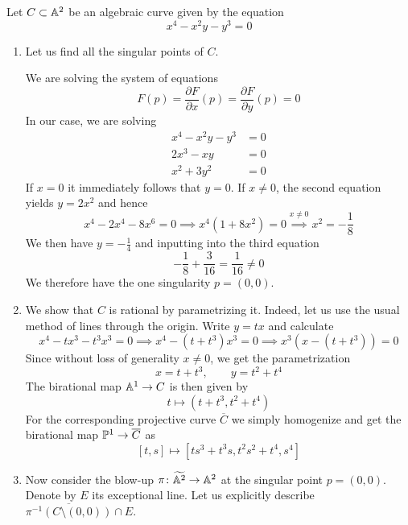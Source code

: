 \documentclass[a4paper, 12pt]{article}
\begin{document}
\begin{Exercise}
    Let $C \subset \A^2$ be an algebraic curve given by the equation
    \[
        x^4 - x^2y - y^3 = 0
    \]
    \begin{enumerate}[label=(\roman*)]
        \item Let us find all the singular points of $C$.

            We are solving the system of equations
            \[
                F(p) = \frac{\partial F}{\partial x}(p) = \frac{\partial F}{\partial y}(p) = 0
            \]
            In our case, we are solving
            \begin{align*}
                x^4 - x^2y - y^3 &= 0 \\
                2x^3 - xy &= 0 \\
                x^2 + 3y^2 &= 0
            \end{align*}
            If $x = 0$ it immediately follows that $y = 0$.
            If $x \neq 0$, the second equation yields $y = 2x^2$ and hence
            \[
                x^4 - 2x^4 - 8x^6 = 0
                \implies x^4(1 + 8x^2) = 0
                \overset{x\neq 0}{\implies} x^2 = -\frac{1}{8}
            \]
            We then have $y = -\frac{1}{4}$ and inputting into the third equation
            \[
                -\frac{1}{8} + \frac{3}{16} = \frac{1}{16} \neq 0
            \]
            We therefore have the one singularity $p = (0, 0)$.
        \item We show that $C$ is rational by parametrizing it.
            Indeed, let us use the usual method of lines through the origin.
            Write $y = tx$ and calculate
            \[
                x^4 - tx^3 -t^3x^3 = 0
                \implies x^4 - (t+t^3)x^3 = 0
                \implies x^3\left( x - (t + t^3) \right) = 0
            \]
            Since without loss of generality $x \neq 0$, we get the parametrization
            \[
                x = t + t^3, \quad\quad y = t^2 + t^4
            \]
            The birational map $\A^1 \to C$ is then given by
            \[
                t \mapsto (t + t^3, t^2 + t^4)
            \]
            For the corresponding projective curve $\overline{C}$ we simply
            homogenize and get the birational map $\P^1 \to \overline{C}$ as
            \[
                [t, s] \mapsto [ts^3 + t^3s, t^2s^2 + t^4, s^4]
            \]
        \item Now consider the blow-up $\pi \colon \widetilde{\A^2} \to \A^2$
            at the singular point $p = (0, 0)$.
            Denote by $E$ its exceptional line.
            Let us explicitly describe $\overline{\pi^{-1}(C \setminus (0, 0))} \cap E$.


\end{enumerate}
\end{Exercise}
\end{document}

